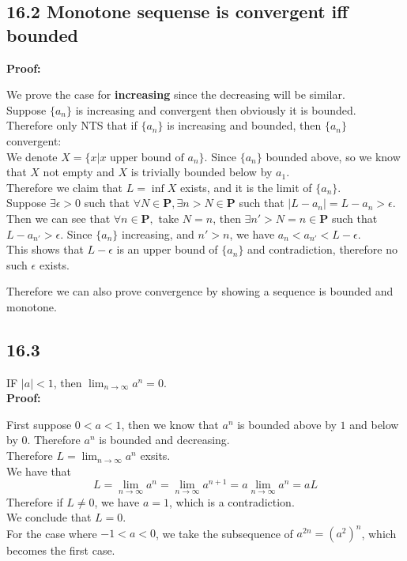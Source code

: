 \documentclass{article}
\begin{document}
\subsection*{16.2 Monotone sequense is convergent iff bounded}
\textbf{Proof:}
\begin{addmargin}[1em]{0em}
    We prove the case for \textbf{increasing} since the decreasing will be similar.\\
    Suppose $\{a_n\}$ is increasing and convergent then obviously it is bounded.\\
    Therefore only NTS that if $\{a_n\}$ is increasing and bounded, then $\{a_n\}$ convergent:\\
    We denote $X = \{x | x \textrm{ upper bound of } a_n\}$. Since $\{a_n\}$ bounded above, so we know that $X$ not empty and $X$ is trivially bounded below by $a_1$.\\
    Therefore we claim that $L = \inf X$ exists, and it is the limit of $\{a_n\}$.\\
    Suppose $\exists \epsilon > 0$ such that $\forall N \in \mathbf{P}, \exists n > N \in \mathbf{P}$ such that $|L - a_n| = L - a_n > \epsilon$.\\
    Then we can see that $\forall n \in \mathbf{P},$ take $N = n$, then $\exists n' > N = n \in \mathbf{P}$ such that $L - a_{n'} > \epsilon$. Since $\{a_n\}$ increasing, and $n' > n$, we have $a_n < a_{n'} < L - \epsilon$.\\
    This shows that $L - \epsilon$ is an upper bound of $\{a_n\}$ and contradiction, therefore no such $\epsilon$ exists.
\end{addmargin}
Therefore we can also prove convergence by showing a sequence is bounded and monotone.
\subsection*{16.3}
IF $|a| < 1$, then $\lim_{n \rightarrow \infty} a^n = 0$.\\
\textbf{Proof:}
\begin{addmargin}[1em]{0em}
    First suppose $0 < a < 1$, then we know that $a^n$ is bounded above by $1$ and below by $0$. Therefore $a^n$ is bounded and decreasing.\\
    Therefore $L = \lim_{n \rightarrow \infty} a^n$ exsits.\\
    We have that
    \begin{equation*}
        L = \lim_{n \rightarrow \infty} a^n = \lim_{n \rightarrow \infty} a^{n+1} = a \lim_{n \rightarrow \infty}a^n = aL
    \end{equation*}
    Therefore if $L \neq 0$, we have $a = 1$, which is a contradiction.\\
    We conclude that $L = 0$.\\
    For the case where $-1 < a < 0$, we take the subsequence of $a^{2n} = (a^2)^n$, which becomes the first case.
\end{addmargin}
\end{document}
